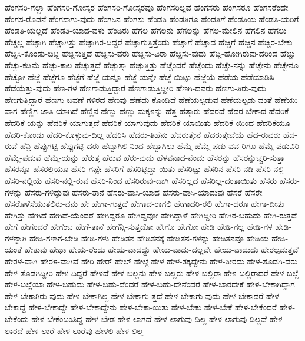 {ಹೆಂಗಸರಿ-ಗೆಲ್ಲಾ
ಹೆಂಗಸರಿ-ಗೋಸ್ಕರ
ಹೆಂಗಸರಿ-ಗೋಸ್ಕರವೂ
ಹೆಂಗಸರಿಲ್ಲವೆ
ಹೆಂಗಸರು
ಹೆಂಗಸರೂ
ಹೆಂಗಸರೆಂದೇ
ಹೆಂಗಸ-ರೊಡನೆ
ಹೆಂಗಸಾಗು-ವುದು
ಹೆಂಗಸಿನ
ಹೆಂಗಸು
ಹೆಂಡತಿ
ಹೆಂಡತಿಗೂ
ಹೆಂಡತಿಗೆ
ಹೆಂಡತಿಯ
ಹೆಂಡತಿ-ಯರಿಗೆ
ಹೆಂಡತಿ-ಯಲ್ಲದೆ
ಹೆಂಡತಿ-ಯಾದ-ವಳು
ಹೆಂಡಿರು
ಹೆಗಲ
ಹೆಗಲನು
ಹೆಗಲನ್ನು
ಹೆಗಲ-ಮೇಲಿನ
ಹೆಗಲಿನ
ಹೆಗಲು
ಹೆಚ್ಚಲ್ಲ
ಹೆಚ್ಚಾಗಿ
ಹೆಚ್ಚಾಗಿತ್ತು
ಹೆಚ್ಚಾಗಿರ-ದಿದ್ದರೆ
ಹೆಚ್ಚಾಗುತ್ತಿತ್ತೆಂದು
ಹೆಚ್ಚಾಗೆ
ಹೆಚ್ಚಾದ
ಹೆಚ್ಚಿಗೆ
ಹೆಚ್ಚಿನ
ಹೆಚ್ಚಿರ-ಬೇಕು
ಹೆಚ್ಚಿಸಿ-ಕೊಂಡು-ಬಿಟ್ಟ
ಹೆಚ್ಚಿಸುತ್ತಿದೆ
ಹೆಚ್ಚಿಸು-ವರು
ಹೆಚ್ಚಿಸು-ವಿರಾ
ಹೆಚ್ಚಿಸು-ವುದು
ಹೆಚ್ಚಿ-ಹೋಗಿರುವು-ದರಿಂದ
ಹೆಚ್ಚು
ಹೆಚ್ಚು-ಕಡಿಮೆ
ಹೆಚ್ಚು-ಕಾಲ
ಹೆಚ್ಚುತ್ತದೆ
ಹೆಚ್ಚುತ್ತಾ
ಹೆಚ್ಚುತ್ತಿತ್ತು
ಹೆಚ್ಚೆಂದರೆ
ಹೆಚ್ಚೆಂದು
ಹೆಚ್ಚೇ-ನನ್ನು
ಹೆಚ್ಚೇನು
ಹೆಚ್ಚೇನೂ
ಹೆಚ್ಚೋ
ಹೆಜ್ಜೆ
ಹೆಜ್ಜೆಗೂ
ಹೆಜ್ಜೆಗೆ
ಹೆಜ್ಜೆ-ಯನ್ನೂ
ಹೆಜ್ಜೆ-ಯನ್ನೇ
ಹೆಜ್ಜೆ-ಯಿಟ್ಟು
ಹೆಜ್ಜೆಯೆ
ಹೆಡೆಯ
ಹೆಡೆಯಾಡಿಸಿ
ಹೆಡೆಯೆತ್ತು-ವುದು
ಹೆಣ-ಗಳ
ಹೆಣಗಾಡುತ್ತಿದ್ದಾರೆ
ಹೆಣಗಾಡುತ್ತಿದ್ದೀರಿ
ಹೆಣಗಿ-ದವರು
ಹೆಣಗು-ತಿರು-ವುದು
ಹೆಣಗುತ್ತಿದ್ದಾರೆ
ಹೆಣಗು-ಬವಣೆ-ಗಳಿರದ
ಹೆಣವು
ಹೆಣೆದು-ಕೊಂಡಿದೆ
ಹೆಣೆಯಲ್ಪಡುವ
ಹೆಣೆಯಲ್ಪಡು-ವಂತೆ
ಹೆಣೆಯು-ವಾಗ
ಹೆಣ್ಣಿಗ-ಜಾತಿ-ಯಾಗಿದೆ
ಹೆಣ್ಣಿನ
ಹೆಣ್ಣು
ಹೆಣ್ಣು-ಮಕ್ಕಳನ್ನು
ಹೆತ್ತ
ಹೆತ್ತಾರು
ಹೆದರದೆ
ಹೆದರ-ಬೇಕಾದ
ಹೆದರಿಕೆ
ಹೆದರಿಕೆ-ಯನ್ನು
ಹೆದರಿಕೆ-ಯಾಗುತ್ತದೆ
ಹೆದರಿಕೆ-ಯಾಗುವುದು
ಹೆದರಿಕೆ-ಯಾಯಿತು
ಹೆದರಿಕೆ-ಯಿಂದ
ಹೆದರಿಕೆಯೂ
ಹೆದರಿ-ಕೊಂಡು
ಹೆದರಿ-ಕೊಳ್ಳುವು-ದಿಲ್ಲ
ಹೆದರಿಸಿ
ಹೆದರು-ತಿಹೆನು
ಹೆದರುತ್ತೇನೆ
ಹೆದರುತ್ತೇವೆಯೆ
ಹೆದ-ರುವರು
ಹೆದ-ರುವೆ
ಹೆನ್ರಿ
ಹೆಪ್ಪುಗಟ್ಟಿ
ಹೆಪ್ಪುಗಟ್ಟಿ-ದರು
ಹೆಬ್ಬಾಗಿಲಿ-ನಿಂದ
ಹೆಬ್ಬಾಗಿಲು
ಹೆಮ್ಮೆ
ಹೆಮ್ಮೆ-ಪಡು-ವವ-ರಿಗೂ
ಹೆಮ್ಮೆ-ಪಡುವಿರಿ
ಹೆಮ್ಮೆ-ಪಡುವೆ
ಹೆಮ್ಮೆ-ಯನ್ನು
ಹೆರುತ್ತ
ಹೆರುವ
ಹೆರು-ವುದು
ಹೆಳವನಾದ-ನೆಂದು
ಹೆಸರನ್ನು
ಹೆಸರನ್ನುಚ್ಚರಿ-ಸುತ್ತಾ
ಹೆಸರನ್ನೂ
ಹೆಸರಲ್ಲಿಯೂ
ಹೆಸರಿ-ಗಷ್ಟೇ
ಹೆಸರಿಗೆ
ಹೆಸರಿಟ್ಟಿದ್ದಾ-ಯಿತು
ಹೆಸರಿಟ್ಟು
ಹೆಸರಿನ
ಹೆಸರಿ-ನಡಿ
ಹೆಸರಿ-ನಲ್ಲಿ
ಹೆಸರಿ-ನಲ್ಲಿಯೆ
ಹೆಸರಿ-ನಲ್ಲಿ-ರುವ
ಹೆಸರಿ-ನಿಂದ
ಹೆಸರಿರುವು-ದಾಗಿ
ಹೆಸರಿಲ್ಲದ
ಹೆಸರಿಲ್ಲ-ದಂತಾಯಿತು
ಹೆಸರು
ಹೆಸರು-ಗಳನ್ನು
ಹೆಸರು-ಗಳಿದ್ದುವು
ಹೆಸರು-ತಾನೆ
ಹೆಸರು-ವಾಸಿ-ಯಾದ
ಹೆಸರು-ವಾಸಿ-ಯಾದುವು
ಹೆಸರೆ
ಹೆಸರೇ
ಹೆಸರೊಳೆಸೆಯುತಲಿರು-ವನು
ಹೇ
ಹೇಗಾ-ಗುತ್ತದೆ
ಹೇಗಾದ-ರಾಗಲಿ
ಹೇಗಾದರಿ-ರಲಿ
ಹೇಗಾ-ದರೂ
ಹೇಗಾ-ದೀತು
ಹೇಗಿತ್ತು
ಹೇಗಿದೆ
ಹೇಗಿದೆ-ಯೆಂದರೆ
ಹೇಗಿದ್ದರೂ
ಹೇಗಿದ್ದವೋ
ಹೇಗಿದ್ದಾಳೆ
ಹೇಗಿದ್ದೀರಿ
ಹೇಗಿರ-ಬಹುದು
ಹೇಗಿ-ರುತ್ತದೆ
ಹೇಗೆ
ಹೇಗೆಂದರೆ
ಹೇಗೆಂಬ
ಹೇಗೆ-ತಾನೆ
ಹೇಗೆನ್ನಿ-ಸುತ್ತದೋ
ಹೇಗೊ
ಹೇಗೋ
ಹೇಡಿ
ಹೇಡಿ-ಗಲ್ಲ
ಹೇಡಿ-ಗಳ
ಹೇಡಿ-ಗಳನ್ನಾಗಿ
ಹೇಡಿ-ಗಳಾಗ-ಬೇಡಿ
ಹೇಡಿ-ಗಳು
ಹೇಡಿತನ
ಹೇಡಿತನಕ್ಕೆ
ಹೇಡಿತನ-ಗಳನ್ನು
ಹೇಡಿತನವೂ
ಹೇಡಿಯ
ಹೇಡಿ-ಯಂತೆ
ಹೇತುವು
ಹೇಥಾ
ಹೇಯ-ರೆಂದು
ಹೇಯ-ವಾದದ್ದು
ಹೇಯ-ವಾದು-ದಲ್ಲವೇ
ಹೇಯ-ವಾದುದು
ಹೇರಲ್ಪಡುತ್ತವೆ
ಹೇರಳ-ವಾಗಿ
ಹೇರಳ-ವಾಗಿವೆ
ಹೇರಿ
ಹೇರ್
ಹೇಲ್
ಹೇಲ್ಗೆ
ಹೇಳ
ಹೇಳ-ತಕ್ಕದ್ದೇನು
ಹೇಳ-ತೀರದು
ಹೇಳ-ತೊಡಗಿ-ದರು
ಹೇಳ-ತೊಡಗಿದ್ದೀರಿ
ಹೇಳ-ದಿದ್ದರೆ
ಹೇಳದೆ
ಹೇಳ-ಬಲ್ಲನು
ಹೇಳ-ಬಲ್ಲರು
ಹೇಳ-ಬಲ್ಲಿರಾ
ಹೇಳ-ಬಲ್ಲಿರಾದರೆ
ಹೇಳ-ಬಲ್ಲೆ
ಹೇಳ-ಬಲ್ಲೆಯಾ
ಹೇಳ-ಬಹುದು
ಹೇಳ-ಬಹು-ದೆಂದರೆ
ಹೇಳ-ಬಹು-ದೇನೆಂದರೆ
ಹೇಳ-ಬಾರದೇಕೆ
ಹೇಳ-ಬೇಕಾಗಿದ್ದಾಗ
ಹೇಳ-ಬೇಕಾಗಿರು-ವುದು
ಹೇಳ-ಬೇಕಾಗಿಲ್ಲ
ಹೇಳ-ಬೇಕಾಗು-ತ್ತದೆ
ಹೇಳ-ಬೇಕಾಗು-ವುದು
ಹೇಳ-ಬೇಕಾದರೆ
ಹೇಳ-ಬೇಕಾದ್ದೆ
ಹೇಳ-ಬೇಕಾದ್ದೇ
ಹೇಳ-ಬೇಕಾದ್ದೇನು
ಹೇಳ-ಬೇಕಾ-ಯಿತು
ಹೇಳ-ಬೇಕು
ಹೇಳ-ಬೇಕೆ
ಹೇಳ-ಬೇಕೆಂದರೆ
ಹೇಳ-ಬೇಕೆಂದು
ಹೇಳ-ಬೇಕೆಂಬಂತಿದ್ದ
ಹೇಳ-ಬೇಡ
ಹೇಳ-ಲಾಗದೆ
ಹೇಳ-ಲಾಗುವು-ದಿಲ್ಲ
ಹೇಳ-ಲಾಗುವು-ದಿಲ್ಲವೆ
ಹೇಳ-ಲಾರದೆ
ಹೇಳ-ಲಾರೆ
ಹೇಳ-ಲಾರೆವು
ಹೇಳಲಿ
ಹೇಳ-ಲಿಲ್ಲ
}
